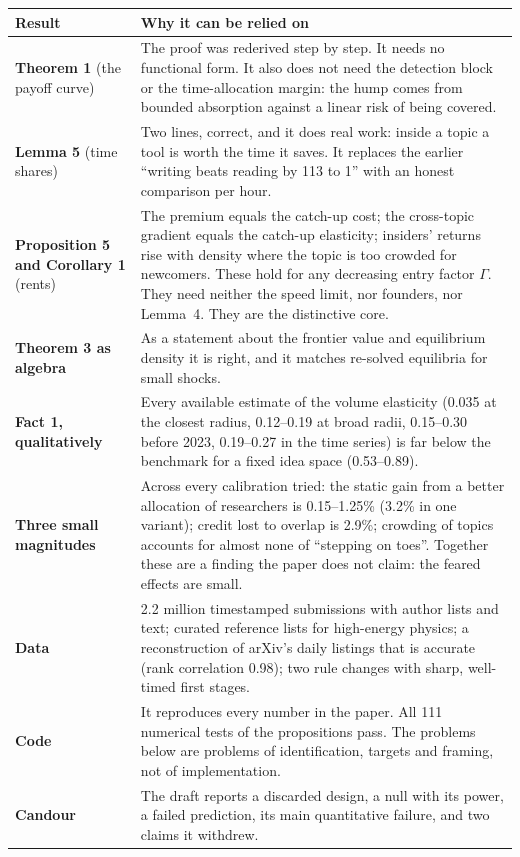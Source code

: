 \begin{center}\small
\begin{tabularx}{\textwidth}{@{}P{1.75in}L@{}}
\toprule
Result & Why it can be relied on \\
\midrule
\textbf{Theorem 1} (the payoff curve) & The proof was rederived step by step. It needs no functional form. It also does not need the detection block or the time-allocation margin: the hump comes from bounded absorption against a linear risk of being covered. \\
\textbf{Lemma 5} (time shares) & Two lines, correct, and it does real work: inside a topic a tool is worth the time it saves. It replaces the earlier ``writing beats reading by 113 to 1'' with an honest comparison per hour. \\
\textbf{Proposition 5 and Corollary 1} (rents) & The premium equals the catch-up cost; the cross-topic gradient equals the catch-up elasticity; insiders' returns rise with density where the topic is too crowded for newcomers. These hold for any decreasing entry factor $\Gamma$. They need neither the speed limit, nor founders, nor Lemma~4. They are the distinctive core. \\
\textbf{Theorem 3 as algebra} & As a statement about the frontier value and equilibrium density it is right, and it matches re-solved equilibria for small shocks. \\
\textbf{Fact 1, qualitatively} & Every available estimate of the volume elasticity (0.035 at the closest radius, 0.12--0.19 at broad radii, 0.15--0.30 before 2023, 0.19--0.27 in the time series) is far below the benchmark for a fixed idea space (0.53--0.89). \\
\textbf{Three small magnitudes} & Across every calibration tried: the static gain from a better allocation of researchers is 0.15--1.25\% (3.2\% in one variant); credit lost to overlap is 2.9\%; crowding of topics accounts for almost none of ``stepping on toes''. Together these are a finding the paper does not claim: the feared effects are small. \\
\textbf{Data} & 2.2 million timestamped submissions with author lists and text; curated reference lists for high-energy physics; a reconstruction of arXiv's daily listings that is accurate (rank correlation 0.98); two rule changes with sharp, well-timed first stages. \\
\textbf{Code} & It reproduces every number in the paper. All 111 numerical tests of the propositions pass. The problems below are problems of identification, targets and framing, not of implementation. \\
\textbf{Candour} & The draft reports a discarded design, a null with its power, a failed prediction, its main quantitative failure, and two claims it withdrew. \\
\bottomrule
\end{tabularx}
\end{center}

